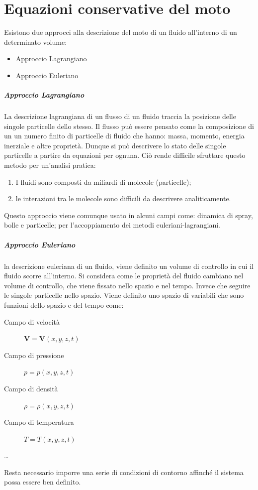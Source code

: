 \chapter{Equazioni conservative del moto}\label{chp:ConservazioneMoto}
Esistono due approcci alla descrizione del moto di un fluido all'interno di un determinato volume:
\begin{itemize}
\item Approccio Lagrangiano
\item Approccio Euleriano
\end{itemize}
\paragraph{Approccio Lagrangiano}
La descrizione lagrangiana di un flusso di un fluido traccia la posizione delle singole particelle dello stesso.
Il flusso può essere pensato come la composizione di un un numero finito di particelle di fluido che hanno: massa, momento, energia inerziale e altre proprietà. Dunque si può descrivere lo stato delle singole particelle a partire da equazioni per ognuna.
Ciò rende difficile sfruttare questo metodo per un'analisi pratica:
\begin{enumerate}
\item I fluidi sono composti da miliardi di molecole (particelle);
\item le interazioni tra le molecole sono difficili da descrivere analiticamente.
\end{enumerate} 
Questo approccio viene comunque usato in alcuni campi come: dinamica di spray, bolle e particelle; per l'accoppiamento dei metodi euleriani-lagrangiani.

\paragraph{Approccio Euleriano}
la descrizione euleriana di un fluido, viene definito un volume di controllo in cui il fluido scorre all'interno.
Si considera come le proprietà del fluido cambiano nel volume di controllo, che viene fissato nello spazio e nel tempo. Invece che seguire le singole particelle nello spazio.
Viene definito uno spazio di variabili che sono funzioni dello spazio e del tempo come:
\begin{description}
\item[Campo di velocità] $\textbf{V} = \textbf{V}(x, y, z, t)$
\item[Campo di pressione] $p = p(x, y, z, t)$
\item[Campo di densità] $\rho = \rho(x, y, z, t)$
\item[Campo di temperatura] $T = T(x, y, z, t)$
\item[\dots]
\end{description}
Resta necessario imporre una serie di condizioni di contorno affinché il sistema possa essere ben definito.

